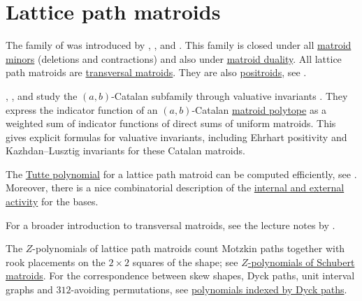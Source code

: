 
\section[latticePathMatroids]{Lattice path matroids}


The family of \label{latticePathMatroidDefinition}
was introduced by , , and
 \cite{BoninMierNoy2003}.  This family is closed under all
\hyperref[matroidMinors]{matroid minors} (deletions and contractions) and also
under \hyperref[matroidDuality]{matroid duality}.
All lattice path matroids are \hyperref[transversalMatroids]{transversal matroids}.
They are also \hyperref[positroid]{positroids}, see \cite{Oh2011}.

, , and  study the
$(a,b)$-Catalan subfamily through valuative invariants
\cite{ChenLiYao2025x}.  They express the indicator function of an
$(a,b)$-Catalan \hyperref[matroidBasePolytope]{matroid polytope} as a
weighted sum of indicator functions of direct sums of uniform matroids.  This
gives explicit formulas for valuative invariants, including Ehrhart positivity
and Kazhdan--Lusztig invariants for these Catalan matroids.

The \hyperref[tuttePolynomial]{Tutte polynomial} for a lattice path matroid
can be computed efficiently, see \cite{BoninMierNoy2003}.
Moreover, there is a nice combinatorial description of
the \hyperref[tutteInternalExternal]{internal and external activity} for the
bases.


\begin{example}
\begin{figure}
\end{figure}
\end{example}


For a broader introduction to transversal matroids, see the lecture notes by
 \cite{Bonin2010TransversalNotes}.

The $Z$-polynomials of lattice path matroids count Motzkin paths together with
rook placements on the $2\times2$ squares of the shape; see
\hyperref[schubertMatroidZ]{$Z$-polynomials of Schubert matroids}.  For the
correspondence between skew shapes, Dyck paths, unit interval graphs and
$312$-avoiding permutations, see
\hyperref[dyckPathPolynomials]{polynomials indexed by Dyck paths}.


